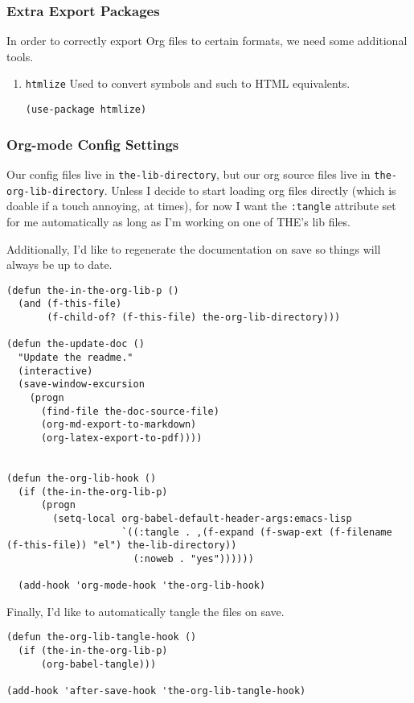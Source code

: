 \documentclass[11pt]{article}
\begin{document}
\subsubsection{Extra Export Packages}
\label{sec:orgc6c2166}
In order to correctly export Org files to certain formats, we need
some additional tools.
\begin{enumerate}
\item \texttt{htmlize}
\label{sec:org649007c}
Used to convert symbols and such to HTML equivalents.
\begin{verbatim}
(use-package htmlize)
\end{verbatim}
\end{enumerate}
\subsubsection{Org-mode Config Settings}
\label{sec:orgb256336}
Our config files live in \texttt{the-lib-directory}, but our org source files
live in \texttt{the-org-lib-directory}. Unless I decide to start loading org
files directly (which is doable if a touch annoying, at times), for
now I want the \texttt{:tangle} attribute set for me automatically as long as
I'm working on one of THE's lib files.

Additionally, I'd like to regenerate the documentation on save so
things will always be up to date.

\begin{verbatim}
(defun the-in-the-org-lib-p ()
  (and (f-this-file)
       (f-child-of? (f-this-file) the-org-lib-directory)))

(defun the-update-doc ()
  "Update the readme."
  (interactive)
  (save-window-excursion
    (progn
      (find-file the-doc-source-file)
      (org-md-export-to-markdown)
      (org-latex-export-to-pdf))))


(defun the-org-lib-hook ()
  (if (the-in-the-org-lib-p)
      (progn
        (setq-local org-babel-default-header-args:emacs-lisp
                    `((:tangle . ,(f-expand (f-swap-ext (f-filename (f-this-file)) "el") the-lib-directory))
                      (:noweb . "yes"))))))

  (add-hook 'org-mode-hook 'the-org-lib-hook)
\end{verbatim}

Finally, I'd like to automatically tangle the files on save.

\begin{verbatim}
(defun the-org-lib-tangle-hook ()
  (if (the-in-the-org-lib-p)
      (org-babel-tangle)))

(add-hook 'after-save-hook 'the-org-lib-tangle-hook)
\end{verbatim}
\end{document}
